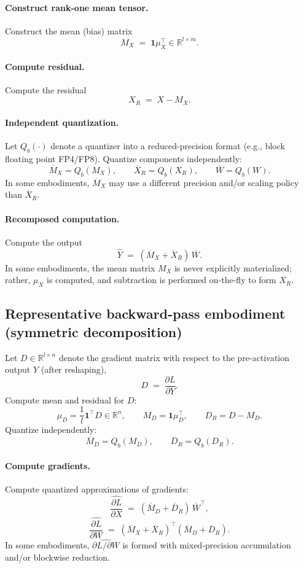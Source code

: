 \documentclass[11pt]{article}
\begin{document}
\paragraph{Construct rank-one mean tensor.}
Construct the mean (bias) matrix
\[
M_X \;=\; \bm{1}\mu_X^\top \in \mathbb{R}^{l\times m}.
\]

\paragraph{Compute residual.}
Compute the residual
\[
X_R \;=\; X - M_X.
\]

\paragraph{Independent quantization.}
Let $Q_b(\cdot)$ denote a quantizer into a reduced-precision format (e.g., block floating point FP4/FP8).
Quantize components independently:
\[
\overline{M}_X = Q_b(M_X), \qquad \overline{X}_R = Q_b(X_R), \qquad \overline{W}=Q_b(W).
\]
In some embodiments, $\overline{M}_X$ may use a different precision and/or scaling policy than $\overline{X}_R$.

\paragraph{Recomposed computation.}
Compute the output
\[
\widehat{Y} \;=\; (\overline{M}_X + \overline{X}_R)\,\overline{W}.
\]
In some embodiments, the mean matrix $M_X$ is never explicitly materialized; rather, $\mu_X$ is computed, and subtraction is performed on-the-fly to form $X_R$.

\subsection{Representative backward-pass embodiment (symmetric decomposition)}
Let $D \in \mathbb{R}^{l\times n}$ denote the gradient matrix with respect to the pre-activation output $Y$ (after reshaping),
\[
D \;=\; \frac{\partial L}{\partial Y}.
\]
Compute mean and residual for $D$:
\[
\mu_D = \frac{1}{l}\bm{1}^\top D \in \mathbb{R}^{n},\qquad
M_D = \bm{1}\mu_D^\top,\qquad
D_R = D - M_D.
\]
Quantize independently:
\[
\overline{M}_D = Q_b(M_D),\qquad \overline{D}_R=Q_b(D_R).
\]

\paragraph{Compute gradients.}
Compute quantized approximations of gradients:
\[
\widehat{\frac{\partial L}{\partial X}} \;=\; (\overline{M}_D + \overline{D}_R)\,\overline{W}^\top,
\]
\[
\widehat{\frac{\partial L}{\partial W}} \;=\; (\overline{M}_X + \overline{X}_R)^\top(\overline{M}_D + \overline{D}_R).
\]
In some embodiments, $\widehat{\partial L/\partial W}$ is formed with mixed-precision accumulation and/or blockwise reduction.
\end{document}
